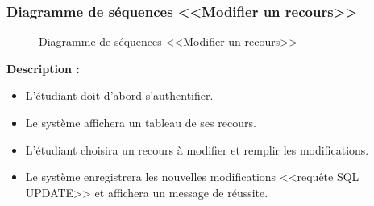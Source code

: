 \documentclass[12pt]{report}
\begin{document}
\newpage

\subsubsection{Diagramme de séquences <<Modifier un recours>>}

\begin{figure}[h]
\centering
    \centerline{}
    \caption{Diagramme de séquences <<Modifier un recours>>}
\end{figure}

\vspace{0.2in}

\textbf{Description :}

\begin{itemize}
    \item L'étudiant doit d'abord s'authentifier.
    \item Le système affichera un tableau de ses recours.
    \item L'étudiant choisira un recours à modifier et remplir les modifications.
    \item Le système enregistrera les nouvelles modifications <<requête SQL UPDATE>> et affichera un message de réussite.
\end{itemize}
\end{document}

